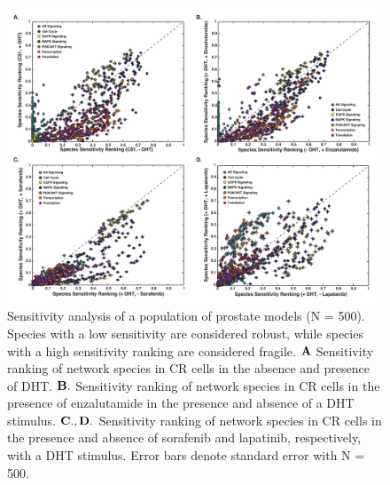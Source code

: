 \documentclass[12pt]{article}
\begin{document}
\begin{figure}\centering
\includegraphics[width=1.0\textwidth]{./figs/Supp_Figure_Sensitivity.pdf}
\caption{Sensitivity analysis of a population of prostate models (N = 500). Species with a low sensitivity are considered robust, while species with a high sensitivity ranking are considered fragile. $\bf{A}$ Sensitivity ranking of network species in CR cells in the absence and presence of DHT. $\bf{B.}$ Sensitivity ranking of network species in CR cells in the presence of enzalutamide in the presence and absence of a DHT stimulus. $\bf{C.,D.}$ Sensitivity ranking of network species in CR cells in the presence and absence of sorafenib and lapatinib, respectively, with a DHT stimulus. Error bars denote standard error with N = 500.}
\label{fg:Supp_Sensitivity}
\end{figure}

\clearpage
\end{document}

